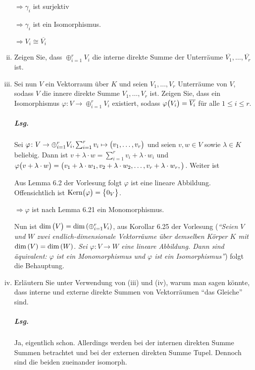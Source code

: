 \documentclass{scrreprt}
\newcommand\Kern{\text{Kern}}
\begin{document}
\begin{enumerate}[(i)]
  $\Rightarrow \gamma_i$ ist surjektiv

  $\Rightarrow \gamma_i$ ist ein Isomorphismus.

  $\Rightarrow V_i \cong \overline{V_i}$

\item Zeigen Sie, dass $\oplus_{i = 1}^r V_i$ die interne direkte Summe der
  Unterräume $\overline{V_1}, \ldots, \overline{V_r}$ ist.

\item Sei nun $V$ ein Vektorraum über $K$ und seien $V_1, \ldots, V_r$
  Unterräume von $V$, sodass $V$ die innere direkte Summe $V_1, \ldots, V_r$
  ist.
  Zeigen Sie, dass ein Isomorphismus $\varphi \colon V \to \oplus_{i = 1}^r V_i$
  existiert, sodass $\varphi\qty\big(V_i) = \overline{V_i}$ für alle
  $1 \leq i \leq r$.

  \subparagraph{Lsg.} Sei $\varphi \colon V \to \oplus_{i = 1}^r V_i,
  \sum_{i = 1}^r v_i \mapsto \qty\big(v_1, \ldots, v_r)$ und seien
  $v, w \in V$ sowie $\lambda \in K$ beliebig.
  Dann ist $v + \lambda \cdot w = \sum_{i = 1}^r v_i + \lambda \cdot w_i$ und
  $\varphi\qty\big(v + \lambda \cdot w) = \qty\big(
    v_1 + \lambda \cdot w_1,
    v_2 + \lambda \cdot w_2,
    \ldots,
    v_r + \lambda \cdot w_r,
    )$.
    Weiter ist
    Aus Lemma 6.2 der Vorlesung folgt $\varphi$ ist eine lineare Abbildung.
    Offensichtlich ist $\Kern\qty\big(\varphi) = \qty\big{0_V}$.

    $\Rightarrow \varphi$ ist nach Lemma 6.21 ein Monomorphismus.

    Nun ist $\dim\qty\big(V) = \dim\qty(\oplus_{i = 1}^r V_i)$, aus Korollar
    6.25 der Vorlesung  (\emph{``Seien $V$ und $W$ zwei endlich-dimensionale
      Vektorräume über demselben Körper $K$ mit $\dim\qty(V) = \dim\qty(W)$.
      Sei $\varphi \colon V \to W$ eine lineare Abbildung.
      Dann sind äquivalent: $\varphi$ ist ein Monomorphismus und $\varphi$
      ist ein Isomorphismus''}) folgt die Behauptung.

  \item Erläutern Sie unter Verwendung von (iii) und (iv), warum man sagen
    könnte, dass interne und externe direkte Summen von Vektorräumen
    ``das Gleiche'' sind.

    \subparagraph{Lsg.} Ja, eigentlich schon.
    Allerdings werden bei der internen direkten Summe Summen betrachtet
    und bei der externen direkten Summe Tupel.
    Dennoch sind die beiden zueinander isomorph.
\end{enumerate}
\end{document}
